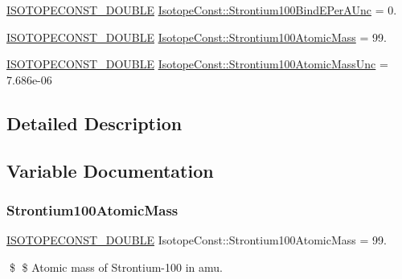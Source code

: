 \begin{DoxyCompactItemize}
\mbox{\hyperlink{group___isotope_const-_macros_ga8f45a7272ce02c0b4c65c44636ed719a}{I\+S\+O\+T\+O\+P\+E\+C\+O\+N\+S\+T\+\_\+\+D\+O\+U\+B\+LE}} \mbox{\hyperlink{group___isotope_const-_strontium-_sr100_gafde252e1aa2f563ae45a9697f4b178e4}{Isotope\+Const\+::\+Strontium100\+Bind\+E\+Per\+A\+Unc}} = 0.
\item 
\mbox{\hyperlink{group___isotope_const-_macros_ga8f45a7272ce02c0b4c65c44636ed719a}{I\+S\+O\+T\+O\+P\+E\+C\+O\+N\+S\+T\+\_\+\+D\+O\+U\+B\+LE}} \mbox{\hyperlink{group___isotope_const-_strontium-_sr100_gaf6ee9601a89ad3756e7e5bfee315b95f}{Isotope\+Const\+::\+Strontium100\+Atomic\+Mass}} = 99.
\item 
\mbox{\hyperlink{group___isotope_const-_macros_ga8f45a7272ce02c0b4c65c44636ed719a}{I\+S\+O\+T\+O\+P\+E\+C\+O\+N\+S\+T\+\_\+\+D\+O\+U\+B\+LE}} \mbox{\hyperlink{group___isotope_const-_strontium-_sr100_gaa26e5ecdfc396dcc87d1d5111ae41711}{Isotope\+Const\+::\+Strontium100\+Atomic\+Mass\+Unc}} = 7.\+686e-\/06
\end{DoxyCompactItemize}


\subsection{Detailed Description}


\subsection{Variable Documentation}
\mbox{\label{group___isotope_const-_strontium-_sr100_gaf6ee9601a89ad3756e7e5bfee315b95f}} 
\subsubsection{\texorpdfstring{Strontium100\+Atomic\+Mass}{Strontium100AtomicMass}}
{\footnotesize\ttfamily \mbox{\hyperlink{group___isotope_const-_macros_ga8f45a7272ce02c0b4c65c44636ed719a}{I\+S\+O\+T\+O\+P\+E\+C\+O\+N\+S\+T\+\_\+\+D\+O\+U\+B\+LE}} Isotope\+Const\+::\+Strontium100\+Atomic\+Mass = 99.}

\$ \$ Atomic mass of Strontium-\/100 in amu. \mbox{\label{group___isotope_const-_strontium-_sr100_gaa26e5ecdfc396dcc87d1d5111ae41711}} 
